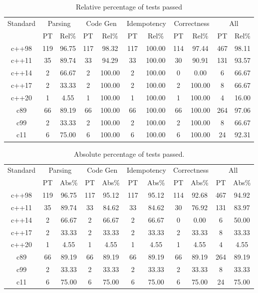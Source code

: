 \documentclass{article}
\begin{document}
\begin{table}[h]
\begin{center}
\footnotesize
\begin{tabular}{ |c|c|c|c|c|c|c|c|c|c|c| }
\multicolumn{1}{|c|}{Standard} & \multicolumn{2}{c|}{Parsing} & \multicolumn{2}{c|}{Code Gen} & \multicolumn{2}{c|}{Idempotency} & \multicolumn{2}{c|}{Correctness} & \multicolumn{2}{c|}{All} \\
  & PT & Rel\% & PT & Rel\% & PT & Rel\% & PT & Rel\% & PT & Rel\% \\
\midrule
c++98 & 119 & 96.75 & 117 & 98.32 & 117 & 100.00 & 114 & 97.44 & 467 & 98.11 \\
c++11 & 35 & 89.74 & 33 & 94.29 & 33 & 100.00 & 30 & 90.91 & 131 & 93.57 \\
c++14 & 2 & 66.67 & 2 & 100.00 & 2 & 100.00 & 0 & 0.00 & 6 & 66.67 \\
c++17 & 2 & 33.33 & 2 & 100.00 & 2 & 100.00 & 2 & 100.00 & 8 & 66.67 \\
c++20 & 1 & 4.55 & 1 & 100.00 & 1 & 100.00 & 1 & 100.00 & 4 & 16.00 \\
c89 & 66 & 89.19 & 66 & 100.00 & 66 & 100.00 & 66 & 100.00 & 264 & 97.06 \\
c99 & 2 & 33.33 & 2 & 100.00 & 2 & 100.00 & 2 & 100.00 & 8 & 66.67 \\
c11 & 6 & 75.00 & 6 & 100.00 & 6 & 100.00 & 6 & 100.00 & 24 & 92.31 \\
\end{tabular}
\end{center}
\caption{Relative percentage of tests passed}
\end{table}\begin{table}[h]
\begin{center}
\footnotesize
\begin{tabular}{ |c|c|c|c|c|c|c|c|c|c|c| }
\multicolumn{1}{|c|}{Standard} & \multicolumn{2}{c|}{Parsing} & \multicolumn{2}{c|}{Code Gen} & \multicolumn{2}{c|}{Idempotency} & \multicolumn{2}{c|}{Correctness} & \multicolumn{2}{c|}{All} \\
  & PT & Abs\% & PT & Abs\% & PT & Abs\% & PT & Abs\% & PT & Abs\% \\
\midrule
c++98 & 119 & 96.75 & 117 & 95.12 & 117 & 95.12 & 114 & 92.68 & 467 & 94.92 \\
c++11 & 35 & 89.74 & 33 & 84.62 & 33 & 84.62 & 30 & 76.92 & 131 & 83.97 \\
c++14 & 2 & 66.67 & 2 & 66.67 & 2 & 66.67 & 0 & 0.00 & 6 & 50.00 \\
c++17 & 2 & 33.33 & 2 & 33.33 & 2 & 33.33 & 2 & 33.33 & 8 & 33.33 \\
c++20 & 1 & 4.55 & 1 & 4.55 & 1 & 4.55 & 1 & 4.55 & 4 & 4.55 \\
c89 & 66 & 89.19 & 66 & 89.19 & 66 & 89.19 & 66 & 89.19 & 264 & 89.19 \\
c99 & 2 & 33.33 & 2 & 33.33 & 2 & 33.33 & 2 & 33.33 & 8 & 33.33 \\
c11 & 6 & 75.00 & 6 & 75.00 & 6 & 75.00 & 6 & 75.00 & 24 & 75.00 \\
\end{tabular}
\end{center}
\caption{Absolute percentage of tests passed.}
\end{table}\newpage
\end{document}
